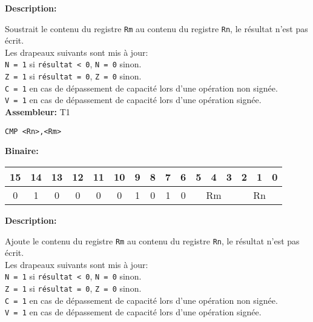 \documentclass{article}
\begin{document}

    \textbf{Description: }

    Soustrait le contenu du registre \texttt{Rm} au contenu du registre \texttt{Rn}, le résultat n'est pas écrit.\\
    Les drapeaux suivants sont mis à jour:\\
    \texttt{N = 1} si \texttt{résultat < 0}, \texttt{N = 0} sinon.\\
    \texttt{Z = 1} si \texttt{résultat = 0}, \texttt{Z = 0} sinon.\\
    \texttt{C = 1} en cas de dépassement de capacité lors d'une opération non signée.\\
    \texttt{V = 1} en cas de dépassement de capacité lors d'une opération signée.\\

    \textbf{Assembleur:} T1

    \begin{lstlisting}
CMP <Rn>,<Rm>
    \end{lstlisting}

    \textbf{Binaire:}

    \begin{tabular}{| c c c c c c c c c c c c c c c c |}
        \hline
        15 & 14 & 13 & 12 & 11 & 10 & \multicolumn{1}{|c}{9} & 8 & 7 & 6 & \multicolumn{1}{|c}{5} & 4 & 3 & \multicolumn{1}{|c}{2} & 1 & 0 \\
        \hline
        0 & 1 & 0 & 0 & 0 & 0 & \multicolumn{1}{|c}{1} & 0 & 1 & 0 & \multicolumn{3}{|c}{Rm} & \multicolumn{3}{|c|}{Rn} \\
        \hline
    \end{tabular}



    \textbf{Description: }

    Ajoute le contenu du registre \texttt{Rm} au contenu du registre \texttt{Rn}, le résultat n'est pas écrit.\\
    Les drapeaux suivants sont mis à jour:\\
    \texttt{N = 1} si \texttt{résultat < 0}, \texttt{N = 0} sinon.\\
    \texttt{Z = 1} si \texttt{résultat = 0}, \texttt{Z = 0} sinon.\\
    \texttt{C = 1} en cas de dépassement de capacité lors d'une opération non signée.\\
    \texttt{V = 1} en cas de dépassement de capacité lors d'une opération signée.\\
\end{document}

